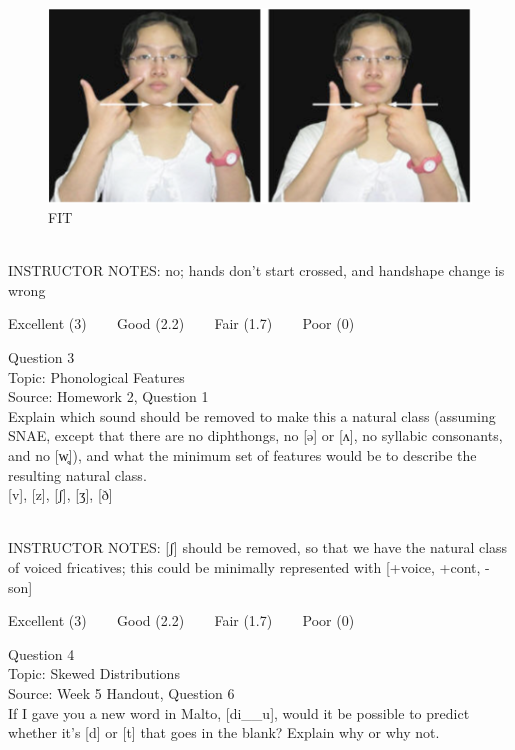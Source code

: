 \documentclass[12pt]{article}
\begin{document}
\begin{figure}[H]
\includegraphics{../images/taiwansign_fit.png}
\caption{FIT}
\end{figure}

~\\
INSTRUCTOR NOTES: no; hands don't start crossed, and handshape change is wrong


\vfill
Excellent (3) ~~~ Good (2.2) ~~~ Fair (1.7) ~~~ Poor (0)
\newpage

{\large Question 3}\\

Topic: Phonological Features\\
Source: Homework 2, Question 1\\

Explain which sound should be removed to make this a natural class (assuming SNAE, except that there are no diphthongs, no [ə] or [ʌ], no syllabic consonants, and no [w̥]), and what the minimum set of features would be to describe the resulting natural class.\\

{[v]}, {[z]}, {[ʃ]}, {[ʒ]}, {[ð]}


~\\
INSTRUCTOR NOTES: [ʃ] should be removed, so that we have the natural class of voiced fricatives; this could be minimally represented with [+voice, +cont, -son]


\vfill
Excellent (3) ~~~ Good (2.2) ~~~ Fair (1.7) ~~~ Poor (0)
\newpage

{\large Question 4}\\

Topic: Skewed Distributions\\
Source: Week 5 Handout, Question 6\\

If I gave you a new word in Malto, [di\_\_u], would it be possible to predict whether it's [d] or [t] that goes in the blank? Explain why or why not.\\
\end{document}
